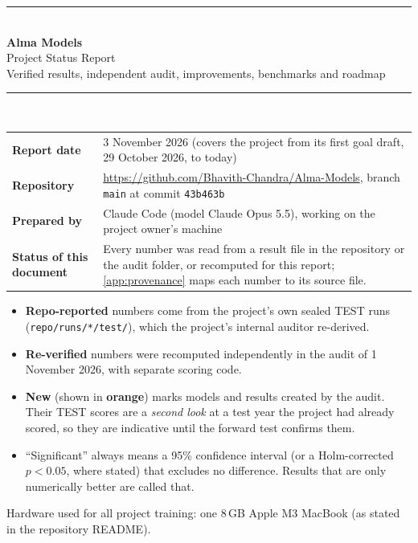 \documentclass[10pt,a4paper]{article}
\newcommand{\src}[1]{{\footnotesize\texttt{#1}}}
\newcommand{\new}[1]{\textcolor{almaorange}{\textbf{#1}}}
\begin{document}
\begin{titlepage}
\thispagestyle{empty}\setlength{\parindent}{0pt}
\vspace*{2.2cm}
{\color{almablue}\rule{\linewidth}{1.2pt}}\\[0.6cm]
{\Huge\bfseries Alma Models}\\[0.35cm]
{\LARGE Project Status Report}\\[0.25cm]
{\large Verified results, independent audit, improvements, benchmarks and roadmap}\\[0.4cm]
{\color{almablue}\rule{\linewidth}{1.2pt}}\\[1.2cm]

\noindent\begin{tabularx}{\linewidth}{@{}lX@{}}
\textbf{Report date} & 3 November 2026 (covers the project from its first goal draft, 29 October 2026, to today)\\
\textbf{Repository} & \url{https://github.com/Bhavith-Chandra/Alma-Models}, branch \texttt{main} at commit \texttt{43b463b}\\
\textbf{Prepared by} & Claude Code (model Claude Opus 5.5), working on the project owner's machine\\
\textbf{Status of this document} & Every number was read from a result file in the repository or the audit folder, or recomputed for this report; \cref{app:provenance} maps each number to its source file.\\
\end{tabularx}

\vspace{1.2cm}
\noindent\begin{keybox}[title=How to read this report]
\begin{itemize}
\item \textbf{Repo-reported} numbers come from the project's own sealed TEST runs (\src{repo/runs/*/test/}), which the project's internal auditor re-derived.
\item \textbf{Re-verified} numbers were recomputed independently in the audit of 1 November 2026, with separate scoring code.
\item \textbf{New} (shown in \new{orange}) marks models and results created by the audit. Their TEST scores are a \emph{second look} at a test year the project had already scored, so they are indicative until the forward test confirms them.
\item ``Significant'' always means a 95\% confidence interval (or a Holm-corrected $p<0.05$, where stated) that excludes no difference. Results that are only numerically better are called that.
\end{itemize}
\end{keybox}
\vfill
{\small\color{gray} Hardware used for all project training: one 8\,GB Apple M3 MacBook (as stated in the repository README).}
\end{titlepage}
\end{document}
